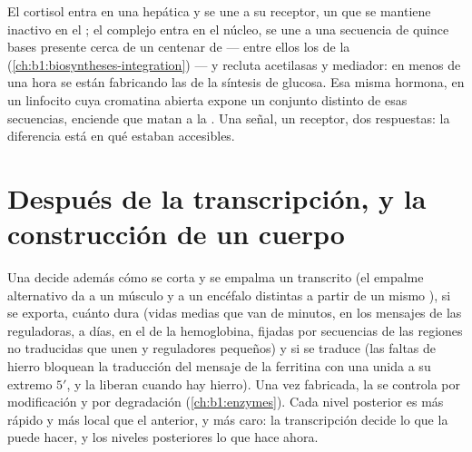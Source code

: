 \begin{example}\label{ex:b1:expression-control:steroid}
El cortisol entra en una  hepática y se une a su receptor, un  que se mantiene inactivo en el ; el complejo entra
en el núcleo, se une a una secuencia de quince bases presente cerca de un
centenar de  --- entre ellos los de la 
(\cref{ch:b1:biosyntheses-integration}) --- y recluta acetilasas y mediador:
en menos de una hora se están fabricando las  de la síntesis de
glucosa. Esa misma hormona, en un linfocito cuya cromatina abierta expone un
conjunto distinto de esas secuencias, enciende  que matan a la .
Una señal, un receptor, dos respuestas: la diferencia está en qué 
estaban accesibles.
\end{example}

\section{Después de la transcripción, y la construcción de un cuerpo}

\begin{proposition}\label{prop:b1:expression-control:posttranscriptional}
Una  decide además cómo se corta y se empalma un transcrito
(el empalme alternativo da a un músculo y a un encéfalo  distintas
a partir de un mismo ), si se exporta, cuánto dura (vidas medias que van
de minutos, en los mensajes de las  reguladoras, a días, en el de
la hemoglobina, fijadas por secuencias de las regiones no traducidas que
unen  y  reguladores pequeños) y si se traduce (las 
faltas de hierro bloquean la traducción del mensaje de la ferritina con una
 unida a su extremo $5'$, y la liberan cuando hay hierro). Una vez
fabricada, la  se controla por modificación y por degradación
(\cref{ch:b1:enzymes}). Cada nivel posterior es más rápido y más local que
el anterior, y más caro: la transcripción decide lo que la  puede
hacer, y los niveles posteriores lo que hace ahora.
\end{proposition}

